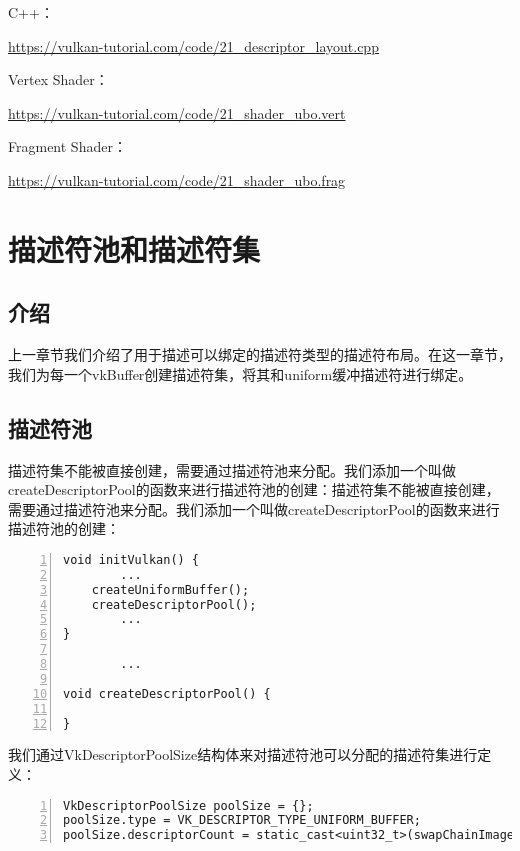 \documentclass{ctexart}
\begin{document}
C++：

\url{https://vulkan-tutorial.com/code/21_descriptor_layout.cpp}

Vertex Shader：

\url{https://vulkan-tutorial.com/code/21_shader_ubo.vert}

Fragment Shader：

\url{https://vulkan-tutorial.com/code/21_shader_ubo.frag}

\newpage
\section{描述符池和描述符集}

\subsection{介绍}

上一章节我们介绍了用于描述可以绑定的描述符类型的描述符布局。在这一章节，我们为每一个vkBuffer创建描述符集，将其和uniform缓冲描述符进行绑定。

\subsection{描述符池}

描述符集不能被直接创建，需要通过描述符池来分配。我们添加一个叫做createDescriptorPool的函数来进行描述符池的创建：描述符集不能被直接创建，需要通过描述符池来分配。我们添加一个叫做createDescriptorPool的函数来进行描述符池的创建：

\begin{lstlisting}[language={[ANSI]C},keywordstyle=\color{blue!70},commentstyle=\color{red!50!green!50!blue!50},frame=shadowbox, rulesepcolor=\color{red!20!green!20!blue!20},basicstyle=\small,numbers=left, numberstyle=\tiny,breaklines=true]
void initVulkan() {
		...
	createUniformBuffer();
	createDescriptorPool();
		...
}

		...

void createDescriptorPool() {

}
\end{lstlisting}

我们通过VkDescriptorPoolSize结构体来对描述符池可以分配的描述符集进行定义：

\begin{lstlisting}[language={[ANSI]C},keywordstyle=\color{blue!70},commentstyle=\color{red!50!green!50!blue!50},frame=shadowbox, rulesepcolor=\color{red!20!green!20!blue!20},basicstyle=\small,numbers=left, numberstyle=\tiny,breaklines=true]
VkDescriptorPoolSize poolSize = {};
poolSize.type = VK_DESCRIPTOR_TYPE_UNIFORM_BUFFER;
poolSize.descriptorCount = static_cast<uint32_t>(swapChainImages.size());
\end{lstlisting}
\end{document}
